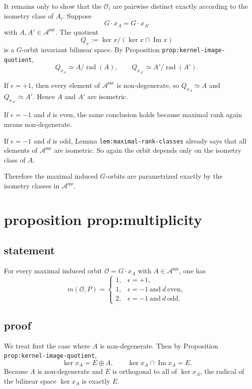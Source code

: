 \documentclass[
  11pt,
]{article}
\begin{document}
It remains only to show that the \(\mathcal O_i\) are pairwise distinct
exactly according to the isometry class of \(A_i\). Suppose \[
G\cdot x_A = G\cdot x_{A'}
\] with \(A,A'\in \mathscr A^{\mathrm{mr}}\). The quotient \[
Q_x:=\ker x/(\ker x\cap \operatorname{Im} x)
\] is a \(G\)-orbit invariant bilinear space. By Proposition
\texttt{prop:kernel-image-quotient}, \[
Q_{x_A}\simeq A/\operatorname{rad}(A),
\qquad
Q_{x_{A'}}\simeq A'/\operatorname{rad}(A').
\]

If \(\epsilon=+1\), then every element of \(\mathscr A^{\mathrm{mr}}\)
is non-degenerate, so \(Q_{x_A}\simeq A\) and \(Q_{x_{A'}}\simeq A'\).
Hence \(A\) and \(A'\) are isometric.

If \(\epsilon=-1\) and \(d\) is even, the same conclusion holds because
maximal rank again means non-degenerate.

If \(\epsilon=-1\) and \(d\) is odd, Lemma
\texttt{lem:maximal-rank-classes} already says that all elements of
\(\mathscr A^{\mathrm{mr}}\) are isometric. So again the orbit depends
only on the isometry class of \(A\).

Therefore the maximal induced \(G\)-orbits are parametrized exactly by
the isometry classes in \(\mathscr A^{\mathrm{mr}}\).

\section{proposition
prop:multiplicity}\label{proposition-propmultiplicity}

\subsection{statement}\label{statement-7}

For every maximal induced orbit \(\mathcal O=G\cdot x_A\) with
\(A\in \mathscr A^{\mathrm{mr}}\), one has \[
m(\mathcal O,P)=
\begin{cases}
1,& \epsilon=+1,\\[0.4ex]
1,& \epsilon=-1\ \text{and}\ d\ \text{even},\\[0.4ex]
2,& \epsilon=-1\ \text{and}\ d\ \text{odd}.
\end{cases}
\]

\subsection{proof}\label{proof-7}

We treat first the case where \(A\) is non-degenerate. Then by
Proposition \texttt{prop:kernel-image-quotient}, \[
\ker x_A=E\oplus A,
\qquad
\ker x_A\cap \operatorname{Im} x_A=E.
\] Because \(A\) is non-degenerate and \(E\) is orthogonal to all of
\(\ker x_A\), the radical of the bilinear space \(\ker x_A\) is exactly
\(E\).
\end{document}
